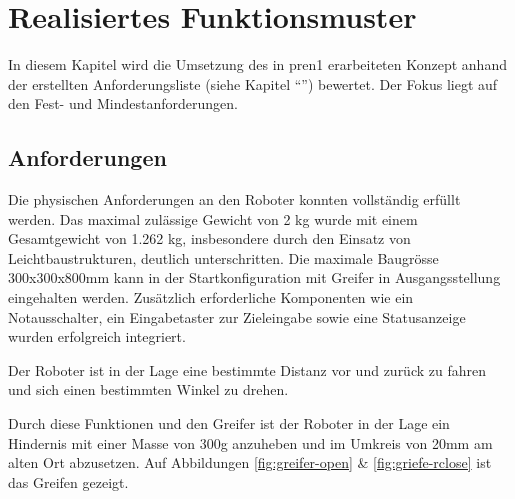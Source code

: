 \section{Realisiertes Funktionsmuster}

In diesem Kapitel wird die Umsetzung des in \acrshort{pren1} erarbeiteten Konzept anhand der erstellten Anforderungsliste (siehe Kapitel ``'') bewertet. Der Fokus liegt auf den Fest- und Mindestanforderungen.

\subsection{Anforderungen}

Die physischen Anforderungen an den Roboter konnten vollständig erfüllt werden. Das maximal zulässige Gewicht von 2 kg wurde mit einem Gesamtgewicht von 1.262 kg, insbesondere durch den Einsatz von Leichtbaustrukturen, deutlich unterschritten. Die maximale Baugrösse 300x300x800mm kann in der Startkonfiguration mit Greifer in Ausgangsstellung eingehalten werden. Zusätzlich erforderliche Komponenten wie ein Notausschalter, ein Eingabetaster zur Zieleingabe sowie eine Statusanzeige wurden erfolgreich integriert.

Der Roboter ist in der Lage eine bestimmte Distanz vor und zurück zu fahren und sich einen bestimmten Winkel zu drehen.

Durch diese Funktionen und den Greifer ist der Roboter in der Lage ein Hindernis mit einer Masse von 300g anzuheben und im Umkreis von 20mm am alten Ort abzusetzen. Auf Abbildungen \ref{fig:greifer-open} \& \ref{fig:griefe-rclose} ist das Greifen gezeigt.


